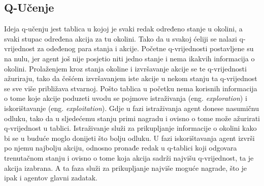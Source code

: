 \subsection{Q-Učenje}
Ideja q-učenju jest tablica u kojoj je svaki redak određeno stanje u okolini, a svaki stupac određena akcija za tu okolini. Tako da u svakoj ćeliji se nalazi q-vrijednost za odeđenog para stanja i akcije. Početne q-vrijednosti postavljene su na nulu, jer agent još nije posjetio niti jedno stanje i nema ikakvih informacija o okolini. Prolaženjem kroz stanja okoline i izvršavanje akcije se te q-vrijednosti ažuriraju, tako da češćem izvršavanjem iste akcije u nekom stanju ta q-vrijednost se sve više približava stvarnoj. Pošto tablica u početku nema korisnih informacija o tome koje akcije poduzeti uvodu se pojmove istraživanja (eng. \textit{exploration}) i iskorištavanje (eng. \textit{exploitation}). Gdje u fazi istraživanja agent donese nasumičnu odluku, tako da u sljedećemu stanju primi nagradu i ovisno o tome može ažurirati q-vrijednost u tablici. Istraživanje služi za prikupljanje informacije o okolini kako bi se u buduće moglo donijeti što bolju odluku. U fazi iskorištavanja agent izvrši po njemu najbolju akciju, odnosno pronađe redak u q-tablici koji odgovara trenutačnom stanju i ovisno o tome koja akcija sadrži najvišu q-vrijednost, ta je akcija izabrana. A ta faza služi za prikupljanje najviše moguće nagrade, što je ipak i agentov glavni zadatak.

